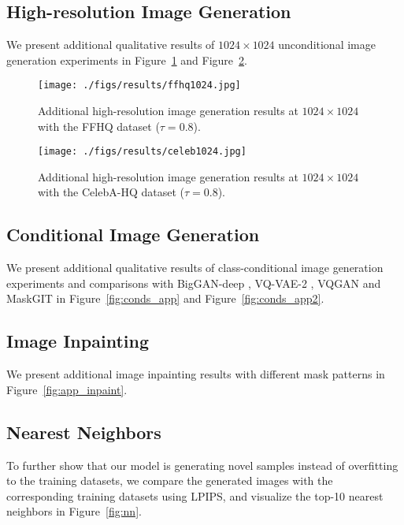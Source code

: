 \documentclass[10pt,twocolumn,letterpaper]{article}
\begin{document}
\subsection{High-resolution Image Generation}
\label{highres_imgs}
We present additional qualitative results of $1024 \times 1024$ unconditional image generation experiments in Figure~\ref{fig:app_ffhq1024} and Figure~\ref{fig:app_celeb1024}.

\begin{figure}[t]
    \centering
	\texttt{[image: ./figs/results/ffhq1024.jpg]}
\caption{Additional high-resolution image generation results at $1024\times1024$ with the FFHQ dataset ($\tau = 0.8$). }
\label{fig:app_ffhq1024}
\end{figure}

\begin{figure}[t]
    \centering
	\texttt{[image: ./figs/results/celeb1024.jpg]}
\caption{Additional high-resolution image generation results at $1024\times1024$ with the CelebA-HQ dataset ($\tau = 0.8$). }
\label{fig:app_celeb1024}
\end{figure}




\subsection{Conditional Image Generation}
\label{cond_imgs}

We present additional qualitative results of class-conditional image generation experiments and comparisons with BigGAN-deep \cite{biggan}, VQ-VAE-2 \cite{vqvae2}, VQGAN \cite{vqgan} and MaskGIT \cite{maskgit} in Figure~\ref{fig:conds_app} and Figure~\ref{fig:conds_app2}.

\subsection{Image Inpainting}
\label{inpaint_imgs}

We present additional image inpainting results with different mask patterns in Figure~\ref{fig:app_inpaint}.

\subsection{Nearest Neighbors}

To further show that our model is generating novel samples instead of overfitting to the training datasets, we compare the generated images with the corresponding training datasets using LPIPS, and visualize the top-10 nearest neighbors in Figure~\ref{fig:nn}.
\end{document}
